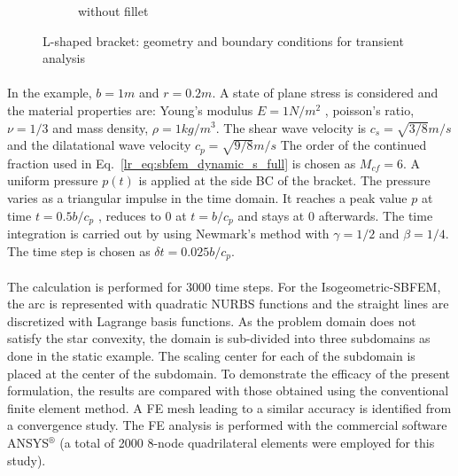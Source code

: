 \begin{figure}
\begin{subfigure}[b]{1\linewidth}
{            }
            \caption{without fillet}
        \end{subfigure}
        \caption{L-shaped bracket: geometry and boundary conditions for transient analysis}
        \label{iso_fig:l_dynamic_geo_bc}
    \end{figure}
%
\paragraph{}
In the example, $b=1m$ and $r=0.2m$.
A state of plane stress is considered and the material properties are:
    Young’s modulus $E = 1 N/m^2$ , poisson’s ratio, $\nu = 1/3$ and mass density, $\rho = 1 kg/m^3$.
    The shear wave velocity is $c_s=\sqrt{3/8}m/s$ and the dilatational wave velocity $c_p=\sqrt{9/8}m/s$
The order of the continued fraction used in Eq.~\ref{lr_eq:sbfem_dynamic_s_full} is chosen as $M_{cf} = 6$.
A uniform pressure $p(t)$ is applied at the side BC of the bracket.
The pressure varies as a triangular impulse in the time domain.
It reaches a peak value $p$ at time $t= 0.5b/c_p$ , reduces to $0$ at $t = b/c_p$ and stays at $0$ afterwards.
The time integration is carried out by using Newmark's method with $\gamma = 1/2$ and $\beta = 1/4$.
The time step is chosen as $\delta t = 0.025b/c_p$.

\paragraph{}
The calculation is performed for 3000 time steps.
For the Isogeometric-SBFEM, the arc is represented with quadratic NURBS functions and the straight lines are discretized with
    Lagrange basis functions.
As the problem domain does not satisfy the star convexity, the domain is sub-divided into three subdomains as done in the static example.
The scaling center for each of the subdomain is placed at the center of the subdomain.
To demonstrate the efficacy of the present formulation, the results are compared with those obtained using the conventional
    finite element method.
A FE mesh leading to a similar accuracy is identified from a convergence study.
The FE analysis is performed with the commercial software ANSYS$^\circledR$ (a total of 2000 8-node quadrilateral elements
    were employed for this study).

